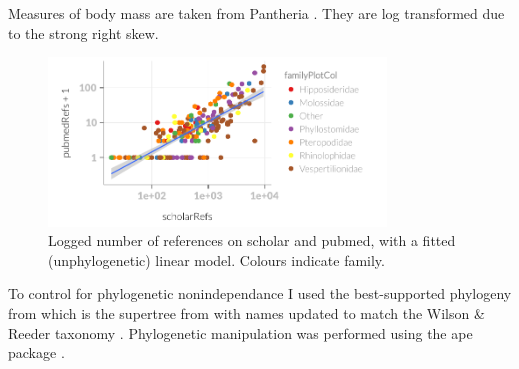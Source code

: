 Measures of body mass are taken from Pantheria \cite{jones2009pantheria}.
They are log transformed due to the strong right skew.
























\begin{knitrout}\footnotesize
{}\color{fgcolor}\begin{figure}[t]

{\centering \includegraphics[width=0.8\textwidth]{figure/scholarvspubmed-1} 

}

\caption[Logged number of references on scholar and pubmed, with a fitted (unphylogenetic) linear model]{Logged number of references on scholar and pubmed, with a fitted (unphylogenetic) linear model. Colours indicate family.}\label{fig:scholarvspubmed}
\end{figure}


\end{knitrout}





To control for phylogenetic nonindependance I used the best-supported phylogeny from \cite{fritz2009geographical} which is the supertree from \cite{bininda2007delayed} with names updated to match the Wilson \& Reeder taxonomy \cite{wilson2005mammal}.
Phylogenetic manipulation was performed using the ape package \cite{ape}.




